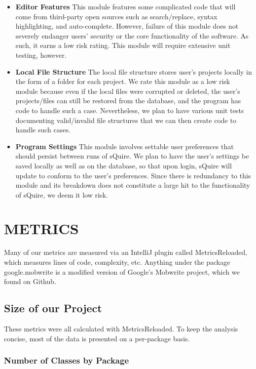 \documentclass[twoside,letterpaper]{article}
\begin{document}
\begin{itemize}
	\item \textbf{Editor Features}
	This module features some complicated code that will come from third-party open sources such as search/replace, syntax highlighting, and auto-complete. However, failure of this module does not severely endanger users' security or the core functionality of the software. As such, it earns a low risk rating. This module will require extensive unit testing, however.
	\item \textbf{Local File Structure} 
	The local file structure stores user's projects locally in the form of a folder for each project. We rate this module as a low risk module because even if the local files were corrupted or deleted, the user's projects/files can still be restored from the database, and the program has code to handle such a case. Nevertheless, we plan to have various unit tests documenting valid/invalid file structures that we can then create code to handle such cases.
	\item \textbf{Program Settings} 
	This module involves settable user preferences that should persist between runs of sQuire. We plan to have the user's settings be saved locally as well as on the database, so that upon login, sQuire will update to conform to the user's preferences. Since there is redundancy to this module and its breakdown does not constitute a large hit to the functionality of sQuire, we deem it low risk.
\end{itemize}


\newpage
\section[METRICS (dani2918)]{\rmfamily\bfseries\color{black} METRICS}

Many of our metrics are measured via an IntelliJ plugin called MetricsReloaded, which measures lines of code, complexity, etc. Anything under the package google.mobwrite is a modified version of Google's Mobwrite project, which we found on Github.


	\subsection{Size of our Project} 
	
	These metrics were all calculated with MetricsReloaded. To keep the analysis concise, most of the data is presented on a per-package basis.
\subsubsection{ Number of Classes by Package }
\end{document}
